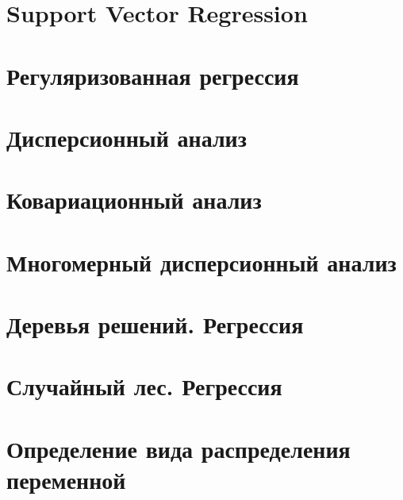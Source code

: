 \documentclass[
  letterpaper,
  DIV=11,
  numbers=noendperiod]{scrreprt}
\theoremstyle{definition}
\theoremstyle{remark}
\begin{document}
\chapter{Support Vector Regression}\label{andan-svr}


\chapter{Регуляризованная регрессия}\label{andan-regreg}


\chapter{Дисперсионный анализ}\label{andan-anova}


\chapter{Ковариационный анализ}\label{andan-ancova}


\chapter{Многомерный дисперсионный анализ}\label{andan-manova}


\chapter{Деревья решений. Регрессия}\label{andan-treesreg}


\chapter{Случайный лес. Регрессия}\label{andan-randforestreg}


\chapter{Определение вида распределения
переменной}\label{andan-distributions}

\end{document}
